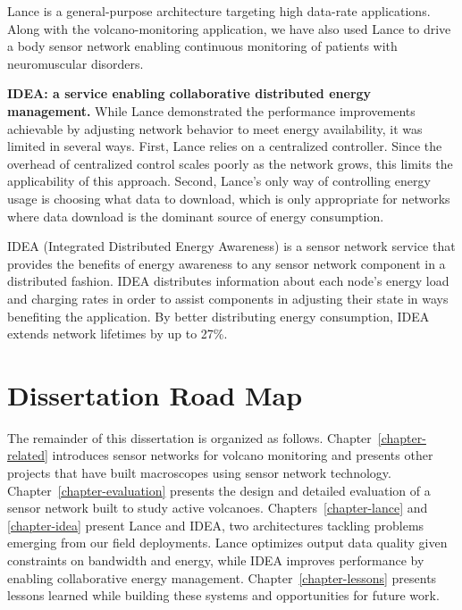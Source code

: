 Lance is a general-purpose architecture targeting high data-rate
applications. Along with the volcano-monitoring application, we have also
used Lance to drive a body sensor network enabling continuous monitoring of
patients with neuromuscular disorders.

\clearpage

\noindent \textbf{IDEA: a service enabling collaborative distributed energy
management.} While Lance demonstrated the performance improvements achievable
by adjusting network behavior to meet energy availability, it was limited in
several ways. First, Lance relies on a centralized controller. Since the
overhead of centralized control scales poorly as the network grows, this
limits the applicability of this approach. Second, Lance's only way of
controlling energy usage is choosing what data to download, which is only
appropriate for networks where data download is the dominant source of energy
consumption.

IDEA (Integrated Distributed Energy Awareness) is a sensor network service
that provides the benefits of energy awareness to any sensor network
component in a distributed fashion. IDEA distributes information about each
node's energy load and charging rates in order to assist components in
adjusting their state in ways benefiting the application. By better
distributing energy consumption, IDEA extends network lifetimes by up to
27\%.

\section{Dissertation Road Map}

The remainder of this dissertation is organized as follows.
Chapter~\ref{chapter-related} introduces sensor networks for volcano
monitoring and presents other projects that have built macroscopes using
sensor network technology. Chapter~\ref{chapter-evaluation} presents the
design and detailed evaluation of a sensor network built to study active
volcanoes. Chapters~\ref{chapter-lance} and \ref{chapter-idea} present Lance
and IDEA, two architectures tackling problems emerging from our field
deployments. Lance optimizes output data quality given constraints on
bandwidth and energy, while IDEA improves performance by enabling
collaborative energy management. Chapter~\ref{chapter-lessons} presents
lessons learned while building these systems and opportunities for future
work.
